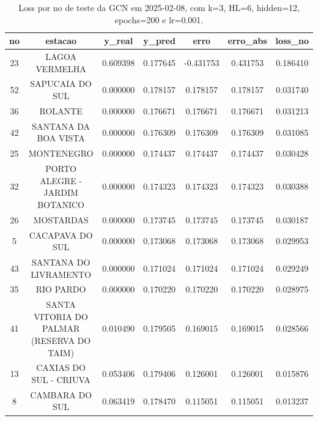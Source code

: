 \begin{table}[h]
\centering
\caption{Loss por no de teste da GCN em 2025-02-08, com k=3, HL=6, hidden=12, epochs=200 e lr=0.001.}
\label{tab:gcn_loss_k3_hl6_h12_e200_d20250208}
\begin{tabular}{ccccccc}
\toprule
no & estacao & y\_real & y\_pred & erro & erro\_abs & loss\_no \\
\midrule
23 & LAGOA VERMELHA & 0.609398 & 0.177645 & -0.431753 & 0.431753 & 0.186410 \\
52 & SAPUCAIA DO SUL & 0.000000 & 0.178157 & 0.178157 & 0.178157 & 0.031740 \\
36 & ROLANTE & 0.000000 & 0.176671 & 0.176671 & 0.176671 & 0.031213 \\
42 & SANTANA DA BOA VISTA & 0.000000 & 0.176309 & 0.176309 & 0.176309 & 0.031085 \\
25 & MONTENEGRO & 0.000000 & 0.174437 & 0.174437 & 0.174437 & 0.030428 \\
32 & PORTO ALEGRE - JARDIM BOTANICO & 0.000000 & 0.174323 & 0.174323 & 0.174323 & 0.030388 \\
26 & MOSTARDAS & 0.000000 & 0.173745 & 0.173745 & 0.173745 & 0.030187 \\
5 & CACAPAVA DO SUL & 0.000000 & 0.173068 & 0.173068 & 0.173068 & 0.029953 \\
43 & SANTANA DO LIVRAMENTO & 0.000000 & 0.171024 & 0.171024 & 0.171024 & 0.029249 \\
35 & RIO PARDO & 0.000000 & 0.170220 & 0.170220 & 0.170220 & 0.028975 \\
41 & SANTA VITORIA DO PALMAR (RESERVA DO TAIM) & 0.010490 & 0.179505 & 0.169015 & 0.169015 & 0.028566 \\
13 & CAXIAS DO SUL - CRIUVA & 0.053406 & 0.179406 & 0.126001 & 0.126001 & 0.015876 \\
8 & CAMBARA DO SUL & 0.063419 & 0.178470 & 0.115051 & 0.115051 & 0.013237 \\
\bottomrule
\end{tabular}
\end{table}
